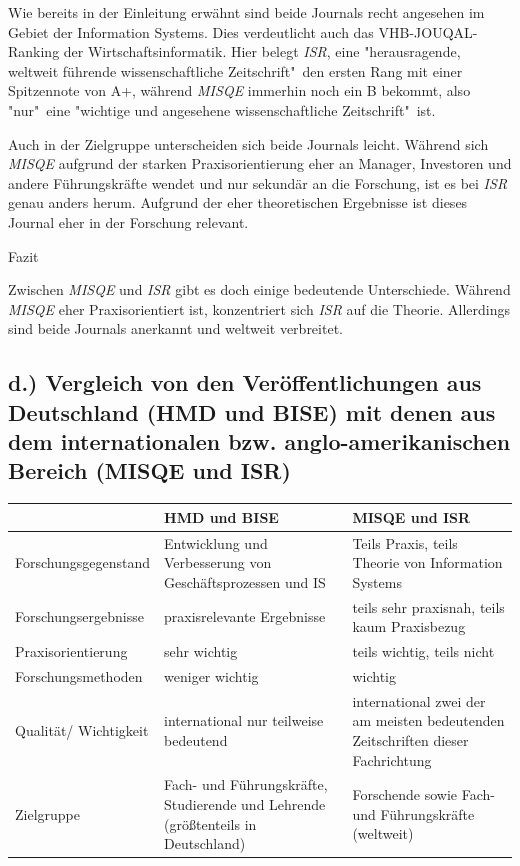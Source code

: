 \documentclass[12pt,utf8]{scrartcl}
\begin{document}
\begin{flushleft}
Wie bereits in der Einleitung erwähnt sind beide Journals recht angesehen im Gebiet der Information Systems. Dies verdeutlicht auch das VHB-JOUQAL-Ranking der Wirtschaftsinformatik. Hier belegt \emph{ISR}, eine "herausragende, weltweit führende wissenschaftliche Zeitschrift"\ den ersten Rang mit einer Spitzennote von A+, während \emph{MISQE} immerhin noch ein B bekommt, also "nur"\ eine "wichtige und angesehene wissenschaftliche Zeitschrift"\ ist\cite{VHBJ}.

Auch in der Zielgruppe unterscheiden sich beide Journals leicht. Während sich \emph{MISQE} aufgrund der starken Praxisorientierung eher an Manager, Investoren und andere Führungskräfte\citep{Chasin2017}\citep{MISQE} wendet und nur sekundär an die Forschung, ist es bei \emph{ISR} genau anders herum. Aufgrund der eher theoretischen Ergebnisse ist dieses Journal eher in der Forschung relevant\citep{ISR}. 
\newline

{\Large Fazit}

Zwischen \emph{MISQE} und \emph{ISR} gibt es doch einige bedeutende Unterschiede. Während \emph{MISQE} eher Praxisorientiert ist, konzentriert sich \emph{ISR} auf die Theorie. Allerdings sind beide Journals anerkannt und weltweit verbreitet. 



\subsection*{\label{sub4:einfuehrung}d.) Vergleich von den Veröffentlichungen aus Deutschland (HMD und BISE) mit denen aus dem internationalen bzw. anglo-amerikanischen Bereich (MISQE und ISR)}

\begin{tabular}{|p{4cm}|p{5.5cm}|p{5.5cm}|}
\hline
& HMD und BISE & MISQE und ISR \\
\hline
Forschungsgegenstand & Entwicklung und Verbesserung von Geschäftsprozessen und IS & Teils Praxis, teils Theorie von Information Systems \\
\hline
Forschungsergebnisse & praxisrelevante Ergebnisse & teils sehr praxisnah, teils kaum Praxisbezug \\
\hline
Praxisorientierung & sehr wichtig & teils wichtig, teils nicht \\
\hline
Forschungsmethoden & weniger wichtig & wichtig \\
\hline
Qualität/ Wichtigkeit & international nur teilweise bedeutend & international zwei der am meisten bedeutenden Zeitschriften dieser Fachrichtung \\
\hline
Zielgruppe & Fach- und Führungskräfte, Studierende und Lehrende (größtenteils in Deutschland) & Forschende sowie Fach- und Führungskräfte (weltweit) \\
\hline
\end{tabular}
\newline
\newline
\newline


\end{flushleft}
\end{document}
